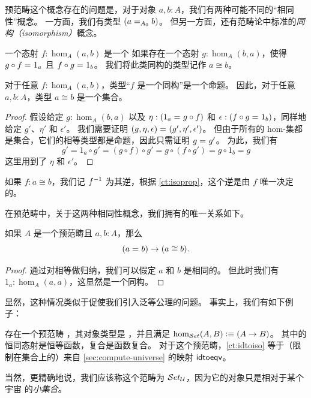 预范畴这个概念存在的问题是，对于对象 $a,b:A$，我们有两种可能不同的``相同性''概念。
一方面，我们有类型 $(\id[A_0]{a}{b})$。
但另一方面，还有范畴论中标准的\emph{同构（isomorphism）}概念。

\begin{defn}\label{ct:isomorphism}
  一个态射 $f:\hom_A(a,b)$ 是一个
  如果存在一个态射 $g:\hom_A(b,a)$，使得 $\id{g\circ f}{1_a}$ 且 $\id{f\circ g}{1_b}$。
  我们将此类同构的类型记作 $a\cong b$。
\end{defn}

\begin{lem}\label{ct:isoprop}
  对于任意 $f:\hom_A(a,b)$，类型``$f$ 是一个同构''是一个命题。
  因此，对于任意 $a,b:A$，类型 $a\cong b$ 是一个集合。
\end{lem}

\begin{proof}
  假设给定 $g:\hom_A(b,a)$ 以及 $\eta:(\id{1_a}{g\circ f})$ 和 $\epsilon:(\id{f\circ g}{1_b})$，同样地给定 $g'$、$\eta'$ 和 $\epsilon'$。
  我们需要证明 $\id{(g,\eta,\epsilon)}{(g',\eta',\epsilon')}$。
  但由于所有的 hom-集都是集合，它们的相等类型都是命题，因此只需证明 $\id g {g'}$。
  为此，我们有
  \[g' = 1_a\circ g' = (g\circ f)\circ g' = g\circ (f\circ g') = g\circ 1_b = g\]
  这里用到了 $\eta$ 和 $\epsilon'$。
\end{proof}

%
如果 $f:a\cong b$，我们记 $\inv f$ 为其逆，根据 \cref{ct:isoprop}，这个逆是由 $f$ 唯一决定的。

在预范畴中，关于这两种相同性概念，我们拥有的唯一关系如下。

\begin{lem}\label{ct:idtoiso}
  如果 $A$ 是一个预范畴且 $a,b:A$，那么
  \[(\id a b)\to (a \cong b).\]
\end{lem}

\begin{proof}
  通过对相等做归纳，我们可以假定 $a$ 和 $b$ 是相同的。
  但此时我们有 $1_a:\hom_A(a,a)$，这显然是一个同构。
\end{proof}

显然，这种情况类似于促使我们引入泛等公理的问题。
事实上，我们有如下例子：

\begin{eg}\label{ct:precatset}
  存在一个预范畴 \uset，其对象类型是 \set，并且满足 $\hom_{\uset}(A,B) \defeq (A\to B)$。
  其中的恒同态射是恒等函数，复合是函数复合。
  对于这个预范畴，\cref{ct:idtoiso} 等于（限制在集合上的）来自 \cref{sec:compute-universe} 的映射 $\idtoeqv$。

  当然，更精确地说，我们应该称这个范畴为 $\uset_{\UU}$，因为它的对象只是相对于某个宇宙 \UU 的\emph{小集合}。
\end{eg}

